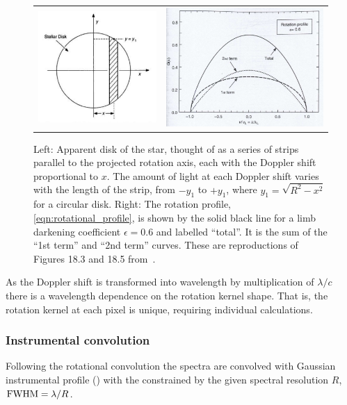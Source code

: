 \begin{figure}
    \centering
    \begin{tabular}{cc}
        \includegraphics[width=0.45\linewidth]{figures/information-content/rotation_diagram} & \includegraphics[width=0.45\linewidth]{figures/information-content/rotational_profile}\\
    \end{tabular}
    \caption[Rotational broadening profile.]{Left: Apparent disk of the star, thought of as a series of strips parallel to the projected rotation axis, each with the Doppler shift proportional to \(x\).
        The amount of light at each Doppler shift varies with the length of the strip, from \(-y_1\) to \(+y_1\), where \(y_1 = \sqrt{R^2-x^2}\) for a circular disk.
        Right: The rotation profile, \cref{eqn:rotational_profile}, is shown by the solid black line for a limb darkening coefficient \(\epsilon=0.6\) and labelled ``total''.
        It is the sum of the ``1st term'' and ``2nd term'' curves.
        These are reproductions of Figures 18.3 and 18.5 from~\citet{gray_observation_2005}.}
    \label{fig:rotationdiagram_and_profile}
\end{figure}


As the Doppler shift \Vsini{} is transformed into wavelength by multiplication of $\lambda / c$ there is a wavelength dependence on the rotation kernel shape.
That is, the rotation kernel at each pixel is unique, requiring individual calculations.

\subsubsection*{Instrumental convolution}
\label{subsubsec:instrumental_convolution}
Following the rotational convolution the spectra are convolved with Gaussian instrumental profile ({\IP{}}) with the {\fwhm}  constrained by the given spectral resolution \(R\), $\textrm{FWHM}=\lambda/R$.

